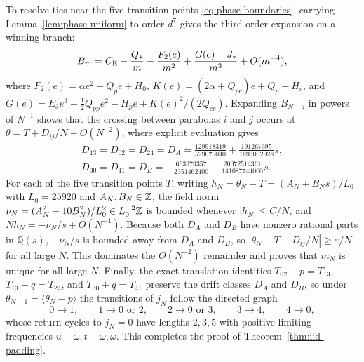 To resolve ties near the five transition points \eqref{eq:phase-boundaries},
carrying Lemma~\ref{lem:phase-uniform} to order $d^7$ gives the third-order
expansion on a winning branch:
\begin{equation}\label{eq:phase-cubic}
 B_m=C_{\mathrm E}-\frac{Q_*}m-\frac{F_2(e)}{m^2}+\frac{G(e)-J_*}{m^3}+O(m^{-4}),
\end{equation}
where $F_2(e)=\alpha e^2+Q_pe+H_0$, $K(e)=(2\alpha+Q_{pc})e+Q_p+H_c$, and
$G(e)=E_3e^3-\frac12Q_{pp}e^2-H_pe+K(e)^2/(2Q_{cc})$. Expanding
$B_{N-j}$ in powers of $N^{-1}$ shows that the crossing between parabolas
$i$ and $j$ occurs at $\theta=T+D_{ij}/N+O(N^{-2})$, where explicit evaluation
gives
\begin{equation}\label{eq:phase-drift}
\begin{gathered}
 D_{13}=D_{02}=D_{24}=D_A
   =\frac{129918319}{529079040}
       +\frac{191267395}{1693052928}s,\\
 D_{30}=D_{41}=D_B
   =-\frac{663979357}{2351462400}
       -\frac{20072514361}{141087744000}s.
\end{gathered}
\end{equation}
For each of the five transition points $T$, writing $h_N=\theta_N-T=(A_N+B_Ns)/L_0$
with $L_0=25920$ and $A_N,B_N\in\mathbb Z$, the field norm
$\nu_N=(A_N^2-10B_N^2)/L_0^2\in L_0^{-2}\mathbb Z$ is bounded whenever
$|h_N|\le C/N$, and $Nh_N=-\nu_N/s+O(N^{-1})$. Because both $D_A$ and $D_B$
have nonzero rational parts in $\mathbb Q(s)$, $-\nu_N/s$ is bounded away
from $D_A$ and $D_B$, so $|\theta_N-T-D_{ij}/N|\ge\varepsilon/N$ for all
large $N$. This dominates the $O(N^{-2})$ remainder and proves that $m_N$ is
unique for all large $N$. Finally, the exact translation identities
$T_{02}-p=T_{13}$, $T_{13}+q=T_{24}$, and $T_{30}+q=T_{41}$ preserve the
drift classes $D_A$ and $D_B$, so under $\theta_{N+1}=\langle\theta_N-p\rangle$
the transitions of $j_N$ follow the directed graph
\[
 0\longrightarrow1,\qquad1\longrightarrow0\text{ or }2,\qquad
 2\longrightarrow0\text{ or }3,\qquad3\longrightarrow4,\qquad
 4\longrightarrow0,
\]
whose return cycles to $j_N=0$ have lengths $2,3,5$ with positive limiting
frequencies $u-\omega,t-\omega,\omega$. This completes the proof of
Theorem~\ref{thm:iid-padding}.
